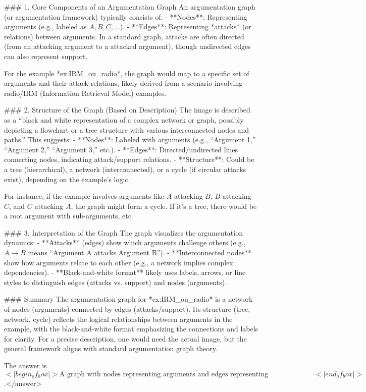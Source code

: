### 1. Core Components of an Argumentation Graph  
An argumentation graph (or argumentation framework) typically consists of:  
- **Nodes**: Representing arguments (e.g., labeled as \( A, B, C, \dots \)).  
- **Edges**: Representing *attacks* (or relations) between arguments. In a standard graph, attacks are often directed (from an attacking argument to a attacked argument), though undirected edges can also represent support.    

For the example *ex:IRM_ou_radio*, the graph would map to a specific set of arguments and their attack relations, likely derived from a scenario involving radio/IRM (Information Retrieval Model) examples.    


### 2. Structure of the Graph (Based on Description)  
The image is described as a “black and white representation of a complex network or graph, possibly depicting a flowchart or a tree structure with various interconnected nodes and paths.” This suggests:  
- **Nodes**: Labeled with arguments (e.g., “Argument 1,” “Argument 2,” “Argument 3,” etc.).  
- **Edges**: Directed/undirected lines connecting nodes, indicating attack/support relations.  
- **Structure**: Could be a tree (hierarchical), a network (interconnected), or a cycle (if circular attacks exist), depending on the example’s logic.    

For instance, if the example involves arguments like \( A \) attacking \( B \), \( B \) attacking \( C \), and \( C \) attacking \( A \), the graph might form a cycle. If it’s a tree, there would be a root argument with sub-arguments, etc.    


### 3. Interpretation of the Graph  
The graph visualizes the argumentation dynamics:  
- **Attacks** (edges) show which arguments challenge others (e.g., \( A \to B \) means “Argument A attacks Argument B”).  
- **Interconnected nodes** show how arguments relate to each other (e.g., a network implies complex dependencies).  
- **Black-and-white format** likely uses labels, arrows, or line styles to distinguish edges (attacks vs. support) and nodes (arguments).    


### Summary  
The argumentation graph for *ex:IRM_ou_radio* is a network of nodes (arguments) connected by edges (attacks/support). Its structure (tree, network, cycle) reflects the logical relationships between arguments in the example, with the black-and-white format emphasizing the connections and labels for clarity. For a precise description, one would need the actual image, but the general framework aligns with standard argumentation graph theory.  

The answer is \(<|begin_of_box|>\text{A graph with nodes representing arguments and edges representing attacks/support, structured as a complex network (e.g., tree, cycle) with labeled nodes and edges}<|end_of_box|>\).</answer>